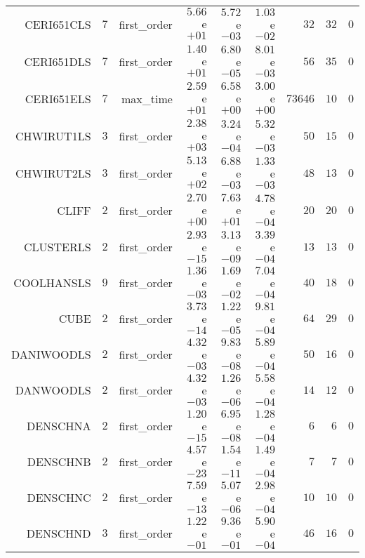 \begin{longtable}{rrrrrrrrr}
CERI651CLS & \(     7\) & first\_order & \( 5.66\)e\(+01\) & \( 5.72\)e\(-03\) & \( 1.03\)e\(-02\) & \(    32\) & \(    32\) & \(     0\) \\
CERI651DLS & \(     7\) & first\_order & \( 1.40\)e\(+01\) & \( 6.80\)e\(-05\) & \( 8.01\)e\(-03\) & \(    56\) & \(    35\) & \(     0\) \\
CERI651ELS & \(     7\) & max\_time & \( 2.59\)e\(+01\) & \( 6.58\)e\(+00\) & \( 3.00\)e\(+00\) & \( 73646\) & \(    10\) & \(     0\) \\
CHWIRUT1LS & \(     3\) & first\_order & \( 2.38\)e\(+03\) & \( 3.24\)e\(-04\) & \( 5.32\)e\(-03\) & \(    50\) & \(    15\) & \(     0\) \\
CHWIRUT2LS & \(     3\) & first\_order & \( 5.13\)e\(+02\) & \( 6.88\)e\(-03\) & \( 1.33\)e\(-03\) & \(    48\) & \(    13\) & \(     0\) \\
CLIFF & \(     2\) & first\_order & \( 2.70\)e\(+00\) & \( 7.63\)e\(+01\) & \( 4.78\)e\(-04\) & \(    20\) & \(    20\) & \(     0\) \\
CLUSTERLS & \(     2\) & first\_order & \( 2.93\)e\(-15\) & \( 3.13\)e\(-09\) & \( 3.39\)e\(-04\) & \(    13\) & \(    13\) & \(     0\) \\
COOLHANSLS & \(     9\) & first\_order & \( 1.36\)e\(-03\) & \( 1.69\)e\(-02\) & \( 7.04\)e\(-04\) & \(    40\) & \(    18\) & \(     0\) \\
CUBE & \(     2\) & first\_order & \( 3.73\)e\(-14\) & \( 1.22\)e\(-05\) & \( 9.81\)e\(-04\) & \(    64\) & \(    29\) & \(     0\) \\
DANIWOODLS & \(     2\) & first\_order & \( 4.32\)e\(-03\) & \( 9.83\)e\(-08\) & \( 5.89\)e\(-04\) & \(    50\) & \(    16\) & \(     0\) \\
DANWOODLS & \(     2\) & first\_order & \( 4.32\)e\(-03\) & \( 1.26\)e\(-06\) & \( 5.58\)e\(-04\) & \(    14\) & \(    12\) & \(     0\) \\
DENSCHNA & \(     2\) & first\_order & \( 1.20\)e\(-15\) & \( 6.95\)e\(-08\) & \( 1.28\)e\(-04\) & \(     6\) & \(     6\) & \(     0\) \\
DENSCHNB & \(     2\) & first\_order & \( 4.57\)e\(-23\) & \( 1.54\)e\(-11\) & \( 1.49\)e\(-04\) & \(     7\) & \(     7\) & \(     0\) \\
DENSCHNC & \(     2\) & first\_order & \( 7.59\)e\(-13\) & \( 5.07\)e\(-06\) & \( 2.98\)e\(-04\) & \(    10\) & \(    10\) & \(     0\) \\
DENSCHND & \(     3\) & first\_order & \( 1.22\)e\(-01\) & \( 9.36\)e\(-01\) & \( 5.90\)e\(-04\) & \(    46\) & \(    16\) & \(     0\) \\

\end{longtable}
